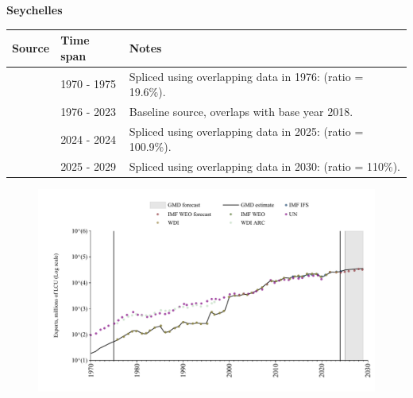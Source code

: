 \documentclass[12pt,a4paper,landscape]{article}
\begin{document}
\begin{adjustbox}{max totalsize={\paperwidth}{\paperheight},center}
\begin{minipage}[t][\textheight][t]{\textwidth}
\vspace*{0.5cm}
{}
\begin{center}
{\Large\bfseries Seychelles}
\end{center}
\vspace{0.5cm}
\begin{table}[H]
\centering
\small
\begin{tabular}{|l|l|l|}
\hline
\textbf{Source} & \textbf{Time span} & \textbf{Notes} \\
\hline
\rowcolor{white}\cite{UN}& 1970 - 1975 &Spliced using overlapping data in 1976: (ratio = 19.6\%).\\
\rowcolor{lightgray}\cite{WDI}& 1976 - 2023 &Baseline source, overlaps with base year 2018.\\
\rowcolor{white}\cite{IMF_IFS}& 2024 - 2024 &Spliced using overlapping data in 2025: (ratio = 100.9\%).\\
\rowcolor{lightgray}\cite{IMF_WEO_forecast}& 2025 - 2029 &Spliced using overlapping data in 2030: (ratio = 110\%).\\
\hline
\end{tabular}
\end{table}
\begin{figure}[H]
\centering
\includegraphics[width=\textwidth,height=0.6\textheight,keepaspectratio]{graphs/SYC_exports.pdf}
\end{figure}
\end{minipage}
\end{adjustbox}
\end{document}
